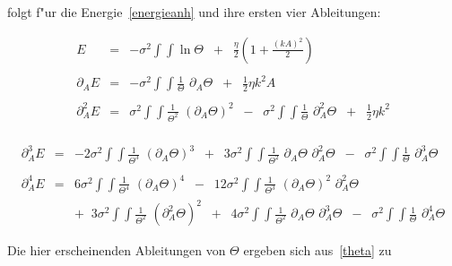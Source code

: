 \noindent folgt f"ur die Energie~\eqref{energieanh} und ihre ersten vier Ableitungen:

\begin{small}
\begin{eqnarray*}
E &=& -\sigma^2 \int\!\!\!\int \ln \Theta\;\;+\;\;\frac{\eta}{2}\left(1+\frac{(kA)^2}{2}\right)\\
&&\\
\partial_A E &=& -\sigma^2 \int\!\!\!\int \frac{1}{\Theta}\,\, \partial_A\Theta\;\;+\;\;\frac{1}{2}\eta k^2A\\
&&\\
\partial_A^2 E &=& \sigma^2 \int\!\!\!\int \frac{1}{\Theta^2}\,\,\left(\partial_A\Theta\right)^2\;\;-\;\;\sigma^2\int\!\!\!\int\frac{1}{\Theta}\,\,\partial_A^2\Theta\;\;+\;\;\frac{1}{2}\eta k^2\\
\end{eqnarray*}
\end{small}

\begin{small}
\begin{eqnarray*}
\partial_A^3 E &=& -2\sigma^2\int\!\!\!\int\frac{1}{\Theta^3}\,\,\left(\partial_A\Theta\right)^3\;\;+\;\;3\sigma^2\int\!\!\!\int\frac{1}{\Theta^2}\,\,\partial_A\Theta\,\,\partial_A^2\Theta\;\;-\;\;\sigma^2\int\!\!\!\int\frac{1}{\Theta}\,\,\partial_A^3\Theta\\
&&\\
\partial_A^4 E &=&6\sigma^2\int\!\!\!\int\frac{1}{\Theta^4}\,\,\left(\partial_A\Theta\right)^4\;\;-\;\;12\sigma^2\int\!\!\!\int\frac{1}{\Theta^3}\,\,\left(\partial_A\Theta\right)^2\,\,\partial_A^2\Theta\\
&&+\;\;3\sigma^2\int\!\!\!\int\frac{1}{\Theta^2}\,\,\left(\partial_A^2\Theta\right)^2\;\;+\;\;4\sigma^2\int\!\!\!\int\frac{1}{\Theta^2}\,\,\partial_A\Theta\,\,\partial_A^3\Theta\;\;-\;\;\sigma^2\int\!\!\!\int\frac{1}{\Theta}\,\,\partial_A^4\Theta
\end{eqnarray*}
\end{small}

\noindent Die hier erscheinenden Ableitungen von $\Theta$ ergeben sich
aus~\eqref{theta} zu

